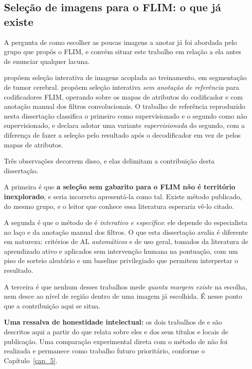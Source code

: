 \subsection{Seleção de imagens para o FLIM: o que já existe}
\label{sec_selecao_flim}

A pergunta de como escolher as poucas imagens a anotar já foi abordada pelo grupo que propôs o \ac{FLIM}, e convém situar este trabalho em relação a ela antes de enunciar qualquer lacuna.

\cite{cerqueira2024interactive} propõem seleção interativa de imagens acoplada ao treinamento, em segmentação de tumor cerebral. \cite{cerqueira2024gtfree} propõem seleção interativa \emph{sem anotação de referência} para codificadores \ac{FLIM}, operando sobre os mapas de atributos do codificador e com anotação manual dos filtros convolucionais. O trabalho de referência reproduzido nesta dissertação \cite{soares2026flim} classifica o primeiro como supervisionado e o segundo como não supervisionado, e declara adotar uma variante \emph{supervisionada} do segundo, com a diferença de fazer a seleção pelo resultado após o decodificador em vez de pelos mapas de atributos.

Três observações decorrem disso, e elas delimitam a contribuição desta dissertação.

A primeira é que \textbf{a seleção sem gabarito para o \ac{FLIM} não é território inexplorado}, e seria incorreto apresentá-la como tal. Existe método publicado, do mesmo grupo, e o leitor que conhece essa literatura esperaria vê-lo citado.

A segunda é que o método de \cite{cerqueira2024gtfree} é \emph{interativo e específico}: ele depende do especialista no laço e da anotação manual dos filtros. O que esta dissertação avalia é diferente em natureza: critérios de \ac{AL} \emph{automáticos} e de uso geral, tomados da literatura de aprendizado ativo e aplicados sem intervenção humana na pontuação, com um piso de sorteio aleatório e um baseline privilegiado que permitem interpretar o resultado.

A terceira é que nenhum desses trabalhos mede \emph{quanta margem existe} na escolha, nem desce ao nível de região dentro de uma imagem já escolhida. É nesse ponto que a contribuição aqui se situa.

\textbf{Uma ressalva de honestidade intelectual:} os dois trabalhos de \cite{cerqueira2024interactive} e \cite{cerqueira2024gtfree} são descritos aqui a partir do que \cite{soares2026flim} relata sobre eles e dos seus títulos e locais de publicação. Uma comparação experimental direta com o método de \cite{cerqueira2024gtfree} não foi realizada e permanece como trabalho futuro prioritário, conforme o Capítulo~\ref{cap_5}.

